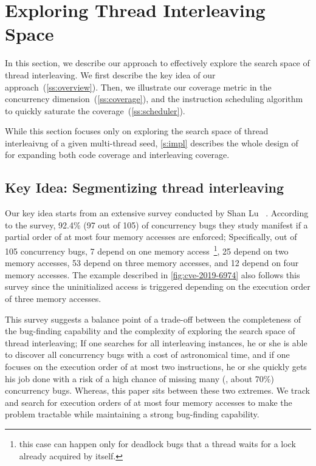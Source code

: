 \section{Exploring Thread Interleaving Space}
\label{s:design}


In this section, we describe our approach to effectively explore the
search space of thread interleaving.
%
We first describe the key idea of our
approach~(\autoref{ss:overview}). Then, we illustrate our coverage
metric in the concurrency dimension~(\autoref{ss:coverage}), and the
instruction scheduling algorithm to quickly saturate the
coverage~(\autoref{ss:scheduler}).



While this section focuses only on exploring the search space of
thread interleaivng of a given multi-thread seed, \autoref{s:impl}
describes the whole design of \sys for expanding both code coverage
and interleaving coverage.


\subsection{Key Idea: Segmentizing thread interleaving}
\label{ss:overview}


Our key idea starts from an extensive survey conducted by Shan Lu
\etal~\cite{learningfrommistakes}.
%
According to the survey, 92.4\% (97 out of 105) of concurrency bugs
they study manifest if a partial order of at most four memory accesses
are enforced;
%
Specifically, out of 105 concurrency bugs, 7 depend on one memory
access~\footnote{this case can happen only for deadlock bugs that a
  thread waits for a lock already acquired by itself.}, 25 depend on
two memory accesses, 53 depend on three memory accesses, and 12 depend
on four memory accesses.
%
The example described in \autoref{fig:cve-2019-6974} also follows this
survey since the uninitialized access is triggered depending on the
execution order of three memory accesses.


This survey suggests a balance point of a trade-off between the
completeness of the bug-finding capability and the complexity of
exploring the search space of thread interleaving;
%
If one searches for all interleaving instances, he or she is able to
discover all concurrency bugs with a cost of astronomical time, and
if one focuses on the execution order of at most two instructions, he
or she quickly gets his job done with a risk of a high chance of
missing many (\eg, about 70\%) concurrency bugs.
%
Whereas, this paper sits between these two extremes. We track and
search for execution orders of at most four memory accesses to make
the problem tractable while maintaining a strong bug-finding
capability.



